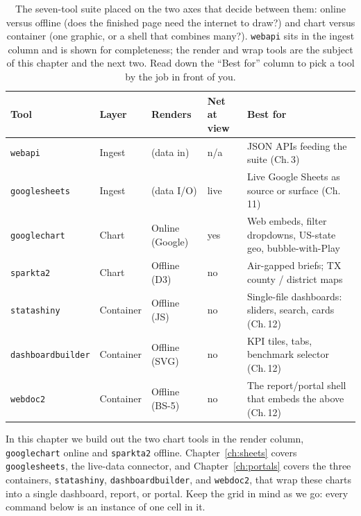 \documentclass[
    a4paper,
    fontsize=10pt,
    twoside=true,
    numbers=noenddot,
]{kaobook}
\begin{document}
\begin{table}[htbp]
\centering
\caption[The visualization suite at a glance]{The seven-tool suite placed on the two axes that decide between them: online versus offline (does the finished page need the internet to draw?) and chart versus container (one graphic, or a shell that combines many?). \texttt{webapi} sits in the ingest column and is shown for completeness; the render and wrap tools are the subject of this chapter and the next two. Read down the \enquote{Best for} column to pick a tool by the job in front of you.}
\label{tab:suite-matrix}
{\footnotesize
\setlength{\tabcolsep}{4pt}
\begin{tabular}{lllll}
\hline
Tool & Layer & Renders & Net at view & Best for \\
\hline
\texttt{webapi}      & Ingest    & (data in)      & n/a  & JSON APIs feeding the suite (Ch.\,3) \\
\texttt{googlesheets}& Ingest    & (data I/O)     & live & Live Google Sheets as source or surface (Ch.\,11) \\
\texttt{googlechart} & Chart     & Online (Google)& yes  & Web embeds, filter dropdowns, US-state geo, bubble-with-Play \\
\texttt{sparkta2}    & Chart     & Offline (D3)   & no   & Air-gapped briefs; TX county / district maps \\
\texttt{statashiny}  & Container & Offline (JS)   & no   & Single-file dashboards: sliders, search, cards (Ch.\,12) \\
\texttt{dashboardbuilder} & Container & Offline (SVG) & no & KPI tiles, tabs, benchmark selector (Ch.\,12) \\
\texttt{webdoc2}     & Container & Offline (BS-5) & no   & The report/portal shell that embeds the above (Ch.\,12) \\
\hline
\end{tabular}
}
\end{table}

In this chapter we build out the two chart tools in the render column, \texttt{googlechart} online and \texttt{sparkta2} offline. Chapter~\ref{ch:sheets} covers \texttt{googlesheets}, the live-data connector, and Chapter~\ref{ch:portals} covers the three containers, \texttt{statashiny}, \texttt{dashboardbuilder}, and \texttt{webdoc2}, that wrap these charts into a single dashboard, report, or portal. Keep the grid in mind as we go: every command below is an instance of one cell in it.
\end{document}
